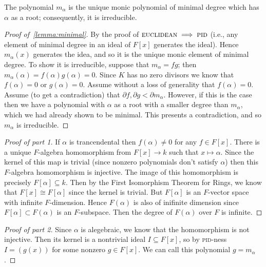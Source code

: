 \begin{lemma}\label{lemma:minimal}
The polynomial $m_\alpha$ is the unique monic polynomial of minimal degree which has $\alpha$ as a root; consequently, it is irreducible.
\end{lemma}

\begin{proof}[Proof of~\ref{lemma:minimal}]
By the proof of $\textsc{euclidean} \implies \textsc{pid}$ (i.e., any element of minimal degree in an ideal of $F[x]$ generates the ideal). Hence $m_\alpha(x)$ generates the idea, and so it is the unique monic element of minimal degree. To show it is irreducible, suppose that $m_\alpha = fg$; then $m_\alpha(\alpha) = f(\alpha)g(\alpha) = 0$. Since $K$ has no zero divisors we know that $f(\alpha) = 0$ or $g(\alpha)=  0$. Assume without a loss of generality that $f(\alpha) = 0$. Assume (to get a contradiction) that $\partial f, \partial g < \partial m_\alpha$. However, if this is the case then we have a polynomial with $\alpha$ as a root with a smaller degree than $m_\alpha$, which we had already shown to be minimal. This presents a contradiction, and so $m_\alpha$ is irreducible.
\end{proof}

\begin{proof}[Proof of part 1]
If $\alpha$ is trancendental then $f(\alpha) \not= 0$ for any $f \in F[x]$.
There is a unique $F$-algebra homomorphism from $F[x] \to k$ such that $x \mapsto \alpha$. Since the kernel of this map is trivial (since nonzero polynomials don't satisfy $\alpha$) then this $F$-algebra homomorphism is injective. The image of this homomorphism is precisely $F[\alpha] \subseteq k$. Then by the First Isomorphism Theorem for Rings, we know that $F[x] \cong F[\alpha]$ since the kernel is trivial. But $F[\alpha]$ is an $F$-vector space with infinite $F$-dimension. Hence $F(\alpha)$ is also of inifinite dimension since $F[\alpha] \subset F(\alpha)$ is an $F$-subspace. Then the degree of $F(\alpha)$ over $F$ is infinite.
\end{proof}

\begin{proof}[Proof of part 2]
Since $\alpha$ is alegebraic, we know that the homomorphism is not injective. Then its kernel is a nontrivial ideal $I \subseteq F[x]$, so by \textsc{pid}-ness $I = (g(x))$ for some nonzero $g \in F[x]$. We can call this polynomial $g = m_\alpha$.
\end{proof}